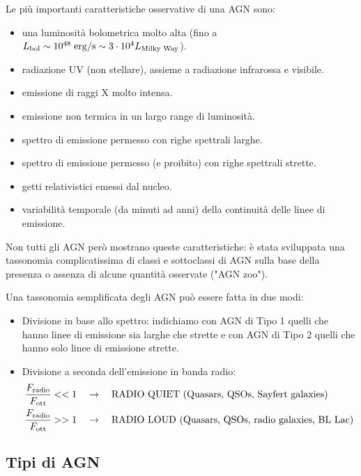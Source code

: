 Le più importanti caratteristiche osservative di una AGN sono:
\begin{itemize}
    \item una luminosità bolometrica molto alta (fino a $L_\textup{bol} \sim 10^{48} \;\si{erg}/\si{s} \sim 3\cdot 10^4 L_\textup{Milky Way}$).
    \item radiazione UV (non stellare), assieme a radiazione infrarossa e visibile.
    \item emissione di raggi X molto intensa.
    \item emissione non termica in un largo range di luminosità.
    \item spettro di emissione permesso con righe spettrali larghe.
    \item spettro di emissione permesso (e proibito) con righe spettrali strette. 
    \item getti relativistici emessi dal nucleo.
    \item variabilità temporale (da minuti ad anni) della continuità delle linee di emissione.
\end{itemize}
Non tutti gli AGN però mostrano queste caratteristiche: è stata sviluppata una tassonomia complicatissima di classi e sottoclassi di AGN sulla base della presenza o assenza di alcune quantità osservate ("AGN zoo").

Una tassonomia semplificata degli AGN può essere fatta in due modi:
\begin{itemize}
    \item Divisione in base allo spettro: indichiamo con AGN di Tipo 1 quelli che hanno linee di emissione sia larghe che strette e con AGN di Tipo 2 quelli che hanno solo linee di emissione strette.
    \item Divisione a seconda dell'emissione in banda radio: 
    \begin{subequations}
        \begin{align}
            \frac{F_\textup{radio}}{F_\textup{ott}} &<< 1 \quad \rightarrow \quad \text{RADIO QUIET (Quasars, QSOs, Sayfert galaxies)} \notag \\
            \frac{F_\textup{radio}}{F_\textup{ott}} &>> 1 \quad \rightarrow \quad \text{RADIO LOUD (Quasars, QSOs, radio galaxies, BL Lac)} \notag
        \end{align}
    \end{subequations}
    \end{itemize}
    
\subsection{Tipi di AGN}
